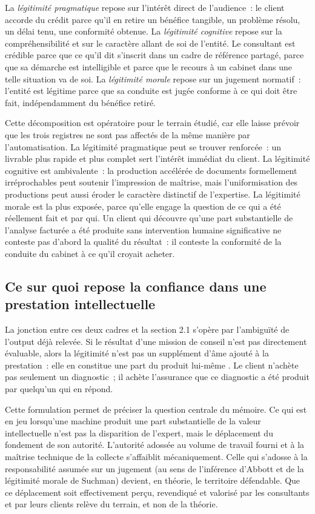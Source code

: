 La \textit{légitimité pragmatique} repose sur l'intérêt direct de l'audience~: le client
accorde du crédit parce qu'il en retire un bénéfice tangible, un problème résolu, un délai
tenu, une conformité obtenue. La \textit{légitimité cognitive} repose sur la
compréhensibilité et sur le caractère allant de soi de l'entité. Le consultant est crédible
parce que ce qu'il dit s'inscrit dans un cadre de référence partagé, parce que sa démarche
est intelligible et parce que le recours à un cabinet dans une telle situation va de soi. La
\textit{légitimité morale} repose sur un jugement normatif~: l'entité est légitime parce que
sa conduite est jugée conforme à ce qui doit être fait, indépendamment du bénéfice retiré.

Cette décomposition est opératoire pour le terrain étudié, car elle laisse prévoir que les
trois registres ne sont pas affectés de la même manière par l'automatisation. La légitimité
pragmatique peut se trouver renforcée~: un livrable plus rapide et plus complet sert
l'intérêt immédiat du client. La légitimité cognitive est ambivalente~: la production
accélérée de documents formellement irréprochables peut soutenir l'impression de maîtrise,
mais l'uniformisation des productions peut aussi éroder le caractère distinctif de
l'expertise. La légitimité morale est la plus exposée, parce qu'elle engage la question de
ce qui a été réellement fait et par qui. Un client qui découvre qu'une part substantielle de
l'analyse facturée a été produite sans intervention humaine significative ne conteste pas
d'abord la qualité du résultat~: il conteste la conformité de la conduite du cabinet à ce
qu'il croyait acheter.

\subsection{Ce sur quoi repose la confiance dans une prestation intellectuelle}

La jonction entre ces deux cadres et la section 2.1 s'opère par l'ambiguïté de l'output déjà relevée.
Si le résultat d'une mission de conseil n'est pas
directement évaluable, alors la légitimité n'est pas un supplément d'âme ajouté à la
prestation~: elle en constitue une part du produit lui-même \cite{alvesson2001}. Le client
n'achète pas seulement un diagnostic~; il achète l'assurance que ce diagnostic a été produit
par quelqu'un qui en répond.

Cette formulation permet de préciser la question centrale du mémoire. Ce qui est en jeu
lorsqu'une machine produit une part substantielle de la valeur intellectuelle n'est pas la
disparition de l'expert, mais le déplacement du fondement de son autorité. L'autorité
adossée au volume de travail fourni et à la maîtrise technique de la collecte s'affaiblit
mécaniquement. Celle qui s'adosse à la responsabilité assumée sur un jugement (au sens de
l'inférence d'Abbott et de la légitimité morale de Suchman) devient, en théorie, le
territoire défendable. Que ce déplacement soit effectivement perçu, revendiqué et valorisé
par les consultants et par leurs clients relève du terrain, et non de la théorie.

